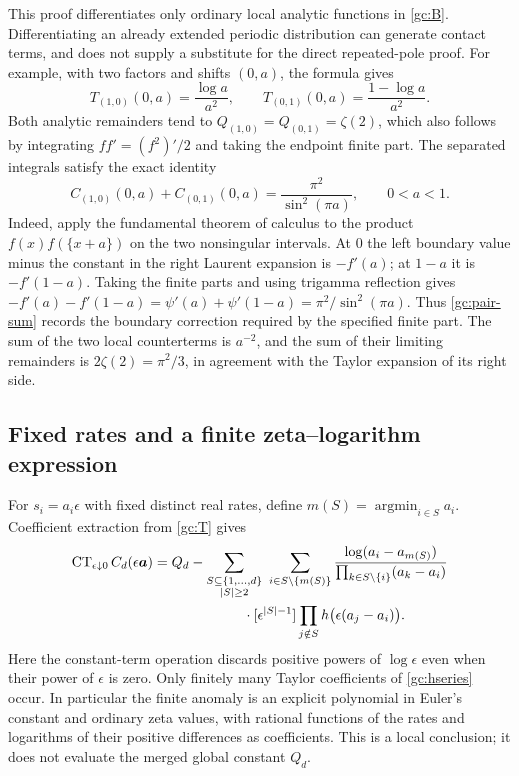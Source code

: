 \documentclass[11pt]{article}
\numberwithin{equation}{section}
\theoremstyle{definition}
\theoremstyle{remark}
\begin{document}
This proof differentiates only ordinary local analytic functions in
\eqref{gc:B}.  Differentiating an already extended periodic distribution
can generate contact terms, and does not supply a substitute for the
direct repeated-pole proof.  For example, with two factors and shifts
$(0,a)$, the formula gives
\[
 T_{(1,0)}(0,a)=\frac{\log a}{a^2},\qquad
 T_{(0,1)}(0,a)=\frac{1-\log a}{a^2}.
\]
Both analytic remainders tend to
$Q_{(1,0)}=Q_{(0,1)}=\zeta(2)$, which also follows by integrating
$ff'=(f^2)'/2$ and taking the endpoint finite part.
The separated integrals satisfy the exact identity
\begin{equation}\label{gc:pair-sum}
 C_{(1,0)}(0,a)+C_{(0,1)}(0,a)
   =\frac{\pi^2}{\sin^2(\pi a)},\qquad 0<a<1.
\end{equation}
Indeed, apply the fundamental theorem of calculus to the product
$f(x)f(\{x+a\})$ on the two nonsingular intervals.  At $0$ the left
boundary value minus the constant in the right Laurent expansion is
$-f'(a)$; at $1-a$ it is $-f'(1-a)$.  Taking the finite parts and using
trigamma reflection gives
$-f'(a)-f'(1-a)=\psi'(a)+\psi'(1-a)=\pi^2/\sin^2(\pi a)$.
Thus \eqref{gc:pair-sum} records the boundary correction required by the
specified finite part.  The sum of the two local counterterms is $a^{-2}$,
and the sum of their limiting remainders is $2\zeta(2)=\pi^2/3$, in
agreement with the Taylor expansion of its right side.

\subsection{Fixed rates and a finite zeta--logarithm expression}
For $s_i=a_i\epsilon$ with fixed distinct real rates, define
$m(S)=\operatorname*{argmin}_{i\in S}a_i$.  Coefficient extraction from
\eqref{gc:T} gives
\begin{align}\label{gc:fixed-constant}
 \operatorname{CT}_{\epsilon\downarrow0}C_d(\epsilon\boldsymbol a)
 ={}&Q_d-\sum_{\substack{S\subseteq\{1,\ldots,d\}\\ |S|\ge2}}
 \ \sum_{i\in S\setminus\{m(S)\}}
 \frac{\log(a_i-a_{m(S)})}
      {\prod_{k\in S\setminus\{i\}}(a_k-a_i)}\notag\\
 &\hspace{18mm}\cdot
 [\epsilon^{|S|-1}]
       \prod_{j\notin S}h\bigl(\epsilon(a_j-a_i)\bigr).
\end{align}
Here the constant-term operation discards positive powers of
$\log\epsilon$ even when their power of $\epsilon$ is zero.  Only finitely
many Taylor coefficients of \eqref{gc:hseries} occur.  In particular the
finite anomaly is an explicit polynomial in Euler's constant and ordinary
zeta values, with rational functions of the rates and logarithms of their
positive differences as coefficients.  This is a local conclusion; it
does not evaluate the merged global constant $Q_d$.
\end{document}

